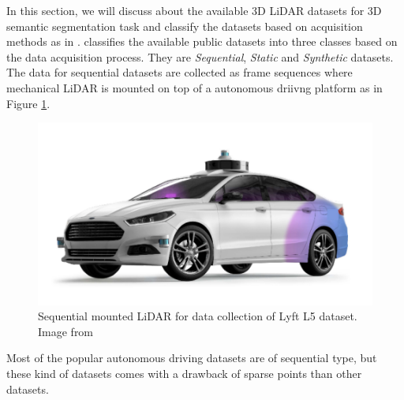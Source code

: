 In this section, we will discuss about the available 3D LiDAR datasets for 3D semantic segmentation task and classify the datasets based on acquisition methods as in \cite{survey3d}.
\cite{survey3d} classifies the available public datasets into three classes based on the data acquisition process.
They are \textit{Sequential}, \textit{Static} and \textit{Synthetic} datasets.
The data for sequential datasets are collected as frame sequences where mechanical LiDAR is mounted on top of a autonomous driivng platform as in Figure \ref{fig:seq_data_lyft}.
\begin{figure}[h!]
    \centering
    \includegraphics[scale=0.25]{images/sequential_lyft.png}
    \caption{Sequential mounted LiDAR for data collection of Lyft L5 dataset. Image from \cite{Lyftl5}}
    \label{fig:seq_data_lyft}
\end{figure}
Most of the popular autonomous driving datasets are of sequential type, but these kind of datasets comes with a drawback of sparse points than other datasets.

